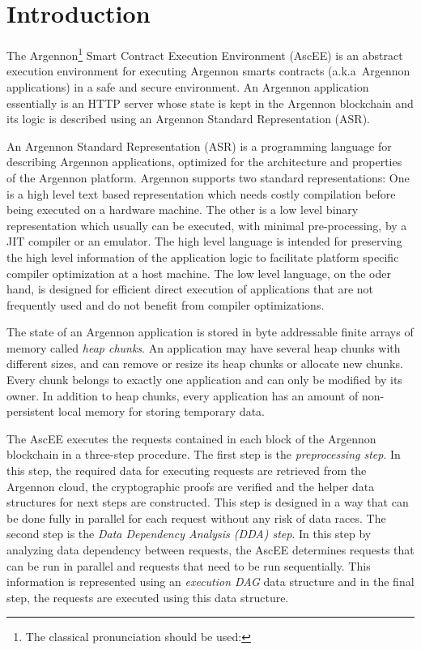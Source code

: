 

\section{Introduction}\label{sec:introduction}

The Argennon\footnote{The classical pronunciation should be used:} Smart Contract Execution
Environment (AscEE) is an abstract execution environment for executing Argennon smarts contracts (a.k.a\ Argennon
applications) in a safe and secure environment. An Argennon application essentially is an HTTP server whose state is
kept in the Argennon blockchain and its logic is described using an Argennon Standard Representation (ASR).

An Argennon Standard Representation (ASR) is a programming language for describing Argennon applications, optimized
for the architecture and properties of the Argennon platform.
Argennon supports two standard representations: One is a high level text based representation which needs
costly compilation before being executed on a hardware machine. The other is a low level binary representation which
usually can be executed, with minimal pre-processing, by a JIT compiler or an emulator. The high level
language is intended for preserving the high level information of the application logic to facilitate
platform specific compiler optimization at a host machine. The low level language, on the oder hand, is designed for
efficient direct execution of applications that are not frequently used and do not benefit from compiler optimizations.

The state of an Argennon application is stored in byte addressable finite arrays of memory called
\emph{heap chunks}. An application may have several heap chunks with different sizes, and can remove or
resize its heap chunks or allocate new chunks. Every chunk belongs to exactly one application and can only be modified
by its owner. In addition to heap chunks, every application has an amount of non-persistent local memory for
storing temporary data.

The AscEE executes the requests contained in each block of the Argennon
blockchain in a three-step procedure. The first step is the \emph{preprocessing step}. In this step, the required
data for executing requests are retrieved from the Argennon cloud, the cryptographic proofs are verified and the
helper data structures for next steps are constructed. This step is
designed in a way that can be done fully in parallel for each request without any risk of data races. The second
step is the \emph{Data Dependency Analysis (DDA) step}.
In this step by analyzing data dependency between requests, the AscEE determines requests that can be run in parallel
and requests that need to be run sequentially. This information is represented using an \emph{execution DAG} data
structure and in the final step, the requests are executed using this data structure.


